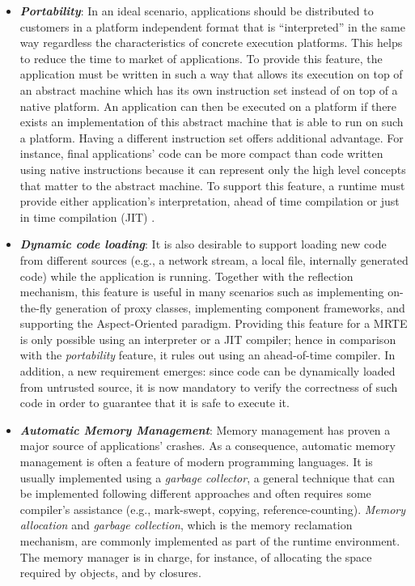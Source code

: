 \begin{itemize}
\item \textbf{\textit{Portability}}:
In an ideal scenario, applications should be distributed to customers in a platform independent format that is ``interpreted'' in the same way regardless the characteristics of concrete execution platforms.
This helps to reduce the time to market of applications.
To provide this feature, the application must be written in such a way that allows its execution on top of an abstract machine which has its own instruction set instead of on top of a native platform.
An application can then be executed on a platform if there exists an implementation of this abstract machine that is able to run on such a platform.
Having a different instruction set offers additional advantage.
For instance, final applications' code can be more compact than code written using native instructions because it can represent only the high level concepts that matter to the abstract machine.
To support this feature, a runtime must provide either application's interpretation, ahead of time compilation \cite{Muller:1997:HFE:1268028.1268029,Proebsting:1997:TJA:1268028.1268031,Wang:2011:MAC:2038698.2038704,Oh:2015:BAC:2757012.2757057} or just in time compilation (JIT) \cite{Inoue:2012:AMC:2398857.2384630,Paleczny:2001:JHT:1267847.1267848,Grcevski:2004:JTJ:1267242.1267254}.

\item \textbf{\textit{Dynamic code loading}}:
It is also desirable to support loading new code from different sources (e.g., a network stream, a local file, internally generated code) while the application is running.
Together with the reflection mechanism, this feature is useful in many scenarios such as implementing on-the-fly generation of proxy classes, implementing component frameworks, and supporting the Aspect-Oriented paradigm.
Providing this feature for a MRTE is only possible using an interpreter or a JIT compiler; hence in comparison with the \textit{portability} feature, it rules out using an ahead-of-time compiler.
In addition, a new requirement emerges: since code can be dynamically loaded from untrusted source, it is now mandatory to verify the correctness of such code in order to guarantee that it is safe to execute it.  

\item \textbf{\textit{Automatic Memory Management}}: 
Memory management has proven a major source of applications' crashes.
As a consequence, automatic memory management is often a feature of modern programming languages.
It is usually implemented using a \textit{garbage collector}, a general technique that can be implemented following different approaches and often requires some compiler's assistance (e.g., mark-swept, copying, reference-counting).
\textit{Memory allocation} and \textit{garbage collection}, which is the memory reclamation mechanism, are commonly implemented as part of the runtime environment.
The memory manager is in charge, for instance, of allocating the space required by objects, and by closures.


\end{itemize}
